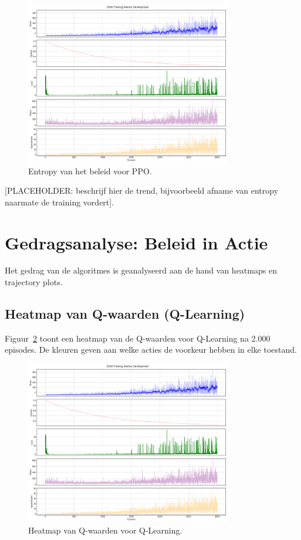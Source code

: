 \documentclass[a4paper,11pt]{report}
\begin{document}
\begin{figure}[ht]
    \centering
    \includegraphics[width=0.8\textwidth]{../Experimenten/Experiment1Snake/DQN/dqn_analysis.png}
    \caption{Entropy van het beleid voor PPO.}
    \label{fig:entropy}
\end{figure}

[PLACEHOLDER: beschrijf hier de trend, bijvoorbeeld afname van entropy naarmate de training vordert].

\section{Gedragsanalyse: Beleid in Actie}
Het gedrag van de algoritmes is geanalyseerd aan de hand van heatmaps en
trajectory plots.

\subsection{Heatmap van Q-waarden (Q-Learning)}
Figuur~\ref{fig:heatmap} toont een heatmap van de Q-waarden voor Q-Learning na
2.000 episodes. De kleuren geven aan welke acties de voorkeur hebben in elke
toestand.

\begin{figure}[ht]
    \centering
    \includegraphics[width=0.8\textwidth]{../Experimenten/Experiment1Snake/DQN/dqn_analysis.png}
    \caption{Heatmap van Q-waarden voor Q-Learning.}
    \label{fig:heatmap}
\end{figure}
\end{document}
